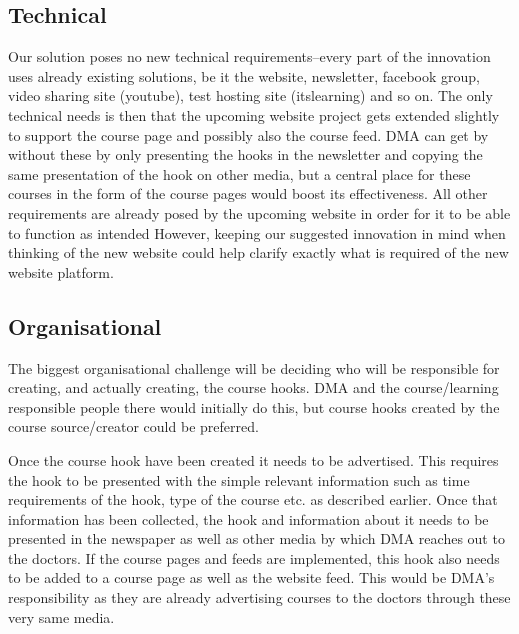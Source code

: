 \subsection{Technical}
Our solution poses no new technical requirements--every part of the innovation uses already existing solutions, be it the website, newsletter, facebook group, video sharing site (youtube), test hosting site (itslearning) and so on. The only technical needs is then that the upcoming website project gets extended slightly to support the course page and possibly also the course feed. DMA can get by without these by only presenting the hooks in the newsletter and copying the same presentation of the hook on other media, but a central place for these courses in the form of the course pages would boost its effectiveness. All other requirements are already posed by the upcoming website in order for it to be able to function as intended However, keeping our suggested innovation in mind when thinking of the new website could help clarify exactly what is required of the new website platform.

\subsection{Organisational}
The biggest organisational challenge will be deciding who will be responsible for creating, and actually creating, the course hooks. DMA and the course/learning responsible people there would initially do this, but course hooks created by the course source/creator could be preferred.

Once the course hook have been created it needs to be advertised. This requires the hook to be presented with the simple relevant information such as time requirements of the hook, type of the course etc. as described earlier. Once that information has been collected, the hook and information about it needs to be presented in the newspaper as well as other media by which DMA reaches out to the doctors. If the course pages and feeds are implemented, this hook also needs to be added to a course page as well as the website feed. This would be DMA’s responsibility as they are already advertising courses to the doctors through these very same media.
